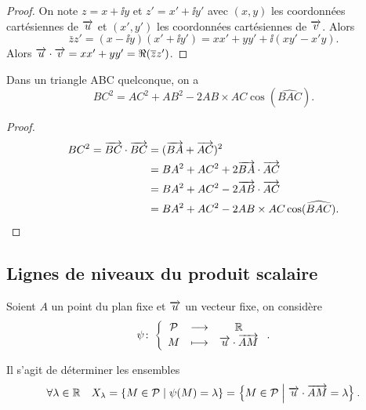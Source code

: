 \begin{proof}
  On note \(z = x + \ii y\) et \(z' = x' + \ii y'\) avec \((x , y)\) les
  coordonnées cartésiennes de \(\overrightarrow{u}\) et \((x',y')\) les coordonnées
  cartésiennes de \(\overrightarrow{v}\). Alors
  \begin{equation}
    \bar{z} z' = (x - \ii y)(x' + \ii y') = xx' + yy' + \ii(xy'-x'y).
  \end{equation}
  Alors \(\overrightarrow{u} \cdot \overrightarrow{v} = xx' + yy' = \Re(\overline{z} z')\).
\end{proof}

\begin{prop}
  Dans un triangle ABC quelconque, on a
  \begin{equation}
    BC^2 = AC^2 + AB^2 - 2 AB \times AC \cos(\widehat{BAC}).
  \end{equation}
\end{prop}

\begin{proof}
  \begin{align*}
    BC^2 = \overrightarrow{BC} \cdot \overrightarrow{BC}& =(\overrightarrow{BA} + \overrightarrow{AC})^2 \\
                                    & = BA^2 + AC^2 +2 \overrightarrow{BA} \cdot
                                    \overrightarrow{AC}\\
                                    & = BA^2 + AC^2 -2 \overrightarrow{AB} \cdot
    \overrightarrow{AC}\\ & = BA^2 + AC^2 -2 AB \times AC \cos(\widehat{BAC}).
  \end{align*}
\end{proof}

\subsection{Lignes de niveaux du produit scalaire}
Soient \(A\) un point du plan fixe et \(\overrightarrow{u}\) un vecteur fixe, on considère
\begin{equation}
  \psi\colon\left\{\begin{array}{ccc}\mathcal{P} & \longrightarrow &\mathbb{R}\\M & \longmapsto & \overrightarrow{u}\cdot\overrightarrow{AM}\end{array}\right..
\end{equation}

Il s'agit de déterminer les ensembles
\begin{equation}
  \forall \lambda \in \mathbb{R} \quad  X_\lambda = \left\{M \in \mathcal{P}\mathrel{}\middle|\mathrel{}\psi(M) = \lambda\right\}
  = \left\{M \in \mathcal{P}\mathrel{}\middle|\mathrel{}\overrightarrow{u} \cdot \overrightarrow{AM} = \lambda\right\}.
\end{equation}

